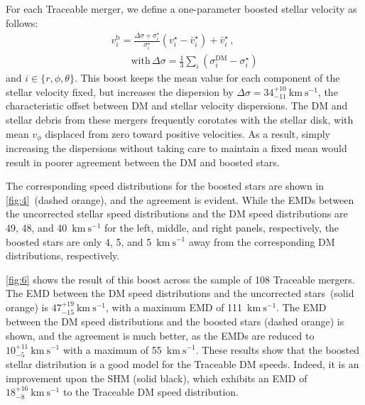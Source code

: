 \documentclass[twocolumn,tighten,twocolappendix]{aastex701}
\newcommand{\kms}{\ensuremath{\text{km}~\text{s}^{-1}}}
\begin{document}
For each Traceable merger, we define a one-parameter boosted stellar velocity as follows:
\begin{gather}
    v_i^{\mathrm{b}} = \frac{\Delta\sigma + \sigma_i^\star}{\sigma_i^\star}\left( v_i^\star-\bar{v}_i^\star \right) + \bar{v}_i^\star \, ,\label{eq:boost}\\
    \qquad\text{with} \, \Delta\sigma = \frac{1}{3}\sum_i \left( \sigma^\text{DM}_i - \sigma^\star_i \right)\label{eq:delta_sigma}
\end{gather}
and $i\in\{r,\phi,\theta\}$. This boost keeps the mean value for each component of the stellar velocity fixed, but increases the dispersion by $\Delta\sigma = 34_{-11}^{+10}~\kms{}$, the characteristic offset between DM and stellar velocity dispersions.
The DM and stellar debris from these mergers frequently corotates with the stellar disk, with mean $v_\phi$ displaced from zero toward positive velocities. As a result, simply increasing the dispersions without taking care to maintain a fixed mean would result in poorer agreement between the DM and boosted stars.

The corresponding speed distributions for the boosted stars are shown in \autoref{fig:4}~(dashed orange), and the agreement is evident. While the EMDs between the uncorrected stellar speed distributions and the DM speed distributions are 49, 48, and 40~\kms{} for the left, middle, and right panels, respectively, the boosted stars are only 4, 5, and 5~\kms{} away from the corresponding DM distributions, respectively.

\autoref{fig:6} shows the result of this boost across the sample of 108 Traceable mergers. The EMD between the DM speed distributions and the uncorrected stars~(solid orange) is $47^{+19}_{-15}~\kms{}$, with a maximum EMD of 111~\kms{}. The EMD between the DM speed distributions and the boosted stars (dashed orange) is shown, and the agreement is much better, as the EMDs are reduced to $10^{+11}_{-5}~\kms{}$ with a maximum of 55~\kms{}. These results show that the boosted stellar distribution is a good model for the Traceable DM speeds. Indeed, it is an improvement upon the SHM (solid black), which exhibits an EMD of $18^{+16}_{-8}~\kms$ to the Traceable DM speed distribution.
\end{document}
